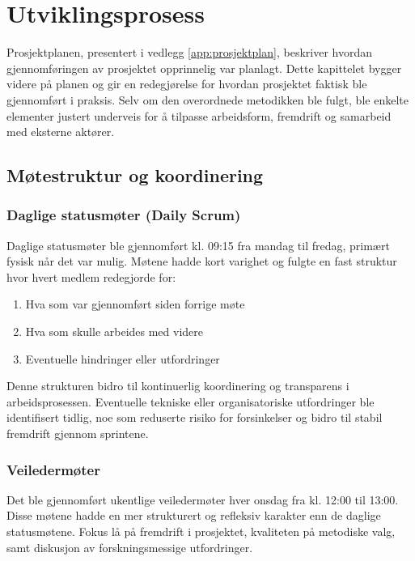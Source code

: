 \section{Utviklingsprosess}

Prosjektplanen, presentert i vedlegg \autoref{app:prosjektplan}, beskriver hvordan gjennomføringen av prosjektet opprinnelig var planlagt. Dette kapittelet bygger videre på planen og gir en redegjørelse for hvordan prosjektet faktisk ble gjennomført i praksis. Selv om den overordnede metodikken ble fulgt, ble enkelte elementer justert underveis for å tilpasse arbeidsform, fremdrift og samarbeid med eksterne aktører.

\subsection{Møtestruktur og koordinering}

\subsubsection*{Daglige statusmøter (Daily Scrum)}

Daglige statusmøter ble gjennomført kl. 09:15 fra mandag til fredag, primært fysisk når det var mulig. Møtene hadde kort varighet og fulgte en fast struktur hvor hvert medlem redegjorde for:

\begin{enumerate}
    \item Hva som var gjennomført siden forrige møte
    \item Hva som skulle arbeides med videre
    \item Eventuelle hindringer eller utfordringer
\end{enumerate}

Denne strukturen bidro til kontinuerlig koordinering og transparens i arbeidsprosessen. Eventuelle tekniske eller organisatoriske utfordringer ble identifisert tidlig, noe som reduserte risiko for forsinkelser og bidro til stabil fremdrift gjennom sprintene.

\subsubsection*{Veiledermøter}

Det ble gjennomført ukentlige veiledermøter hver onsdag fra kl. 12:00 til 13:00. Disse møtene hadde en mer strukturert og refleksiv karakter enn de daglige statusmøtene. Fokus lå på fremdrift i prosjektet, kvaliteten på metodiske valg, samt diskusjon av forskningsmessige utfordringer.

